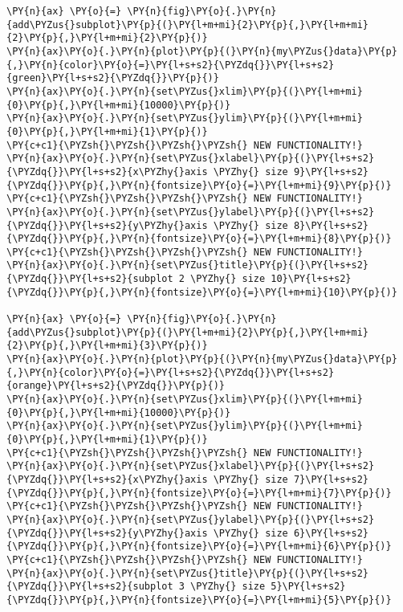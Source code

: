 \begin{tcolorbox}[breakable, size=fbox, boxrule=1pt, pad at break*=1mm,colback=cellbackground, colframe=cellborder]
\begin{Verbatim}[commandchars=\\\{\}]
\PY{n}{ax} \PY{o}{=} \PY{n}{fig}\PY{o}{.}\PY{n}{add\PYZus{}subplot}\PY{p}{(}\PY{l+m+mi}{2}\PY{p}{,}\PY{l+m+mi}{2}\PY{p}{,}\PY{l+m+mi}{2}\PY{p}{)}
\PY{n}{ax}\PY{o}{.}\PY{n}{plot}\PY{p}{(}\PY{n}{my\PYZus{}data}\PY{p}{,}\PY{n}{color}\PY{o}{=}\PY{l+s+s2}{\PYZdq{}}\PY{l+s+s2}{green}\PY{l+s+s2}{\PYZdq{}}\PY{p}{)}
\PY{n}{ax}\PY{o}{.}\PY{n}{set\PYZus{}xlim}\PY{p}{(}\PY{l+m+mi}{0}\PY{p}{,}\PY{l+m+mi}{10000}\PY{p}{)}
\PY{n}{ax}\PY{o}{.}\PY{n}{set\PYZus{}ylim}\PY{p}{(}\PY{l+m+mi}{0}\PY{p}{,}\PY{l+m+mi}{1}\PY{p}{)}
\PY{c+c1}{\PYZsh{}\PYZsh{}\PYZsh{}\PYZsh{} NEW FUNCTIONALITY!}
\PY{n}{ax}\PY{o}{.}\PY{n}{set\PYZus{}xlabel}\PY{p}{(}\PY{l+s+s2}{\PYZdq{}}\PY{l+s+s2}{x\PYZhy{}axis \PYZhy{} size 9}\PY{l+s+s2}{\PYZdq{}}\PY{p}{,}\PY{n}{fontsize}\PY{o}{=}\PY{l+m+mi}{9}\PY{p}{)}
\PY{c+c1}{\PYZsh{}\PYZsh{}\PYZsh{}\PYZsh{} NEW FUNCTIONALITY!}
\PY{n}{ax}\PY{o}{.}\PY{n}{set\PYZus{}ylabel}\PY{p}{(}\PY{l+s+s2}{\PYZdq{}}\PY{l+s+s2}{y\PYZhy{}axis \PYZhy{} size 8}\PY{l+s+s2}{\PYZdq{}}\PY{p}{,}\PY{n}{fontsize}\PY{o}{=}\PY{l+m+mi}{8}\PY{p}{)}
\PY{c+c1}{\PYZsh{}\PYZsh{}\PYZsh{}\PYZsh{} NEW FUNCTIONALITY!}
\PY{n}{ax}\PY{o}{.}\PY{n}{set\PYZus{}title}\PY{p}{(}\PY{l+s+s2}{\PYZdq{}}\PY{l+s+s2}{subplot 2 \PYZhy{} size 10}\PY{l+s+s2}{\PYZdq{}}\PY{p}{,}\PY{n}{fontsize}\PY{o}{=}\PY{l+m+mi}{10}\PY{p}{)}

\PY{n}{ax} \PY{o}{=} \PY{n}{fig}\PY{o}{.}\PY{n}{add\PYZus{}subplot}\PY{p}{(}\PY{l+m+mi}{2}\PY{p}{,}\PY{l+m+mi}{2}\PY{p}{,}\PY{l+m+mi}{3}\PY{p}{)}
\PY{n}{ax}\PY{o}{.}\PY{n}{plot}\PY{p}{(}\PY{n}{my\PYZus{}data}\PY{p}{,}\PY{n}{color}\PY{o}{=}\PY{l+s+s2}{\PYZdq{}}\PY{l+s+s2}{orange}\PY{l+s+s2}{\PYZdq{}}\PY{p}{)}
\PY{n}{ax}\PY{o}{.}\PY{n}{set\PYZus{}xlim}\PY{p}{(}\PY{l+m+mi}{0}\PY{p}{,}\PY{l+m+mi}{10000}\PY{p}{)}
\PY{n}{ax}\PY{o}{.}\PY{n}{set\PYZus{}ylim}\PY{p}{(}\PY{l+m+mi}{0}\PY{p}{,}\PY{l+m+mi}{1}\PY{p}{)}
\PY{c+c1}{\PYZsh{}\PYZsh{}\PYZsh{}\PYZsh{} NEW FUNCTIONALITY!}
\PY{n}{ax}\PY{o}{.}\PY{n}{set\PYZus{}xlabel}\PY{p}{(}\PY{l+s+s2}{\PYZdq{}}\PY{l+s+s2}{x\PYZhy{}axis \PYZhy{} size 7}\PY{l+s+s2}{\PYZdq{}}\PY{p}{,}\PY{n}{fontsize}\PY{o}{=}\PY{l+m+mi}{7}\PY{p}{)}
\PY{c+c1}{\PYZsh{}\PYZsh{}\PYZsh{}\PYZsh{} NEW FUNCTIONALITY!}
\PY{n}{ax}\PY{o}{.}\PY{n}{set\PYZus{}ylabel}\PY{p}{(}\PY{l+s+s2}{\PYZdq{}}\PY{l+s+s2}{y\PYZhy{}axis \PYZhy{} size 6}\PY{l+s+s2}{\PYZdq{}}\PY{p}{,}\PY{n}{fontsize}\PY{o}{=}\PY{l+m+mi}{6}\PY{p}{)}
\PY{c+c1}{\PYZsh{}\PYZsh{}\PYZsh{}\PYZsh{} NEW FUNCTIONALITY!}
\PY{n}{ax}\PY{o}{.}\PY{n}{set\PYZus{}title}\PY{p}{(}\PY{l+s+s2}{\PYZdq{}}\PY{l+s+s2}{subplot 3 \PYZhy{} size 5}\PY{l+s+s2}{\PYZdq{}}\PY{p}{,}\PY{n}{fontsize}\PY{o}{=}\PY{l+m+mi}{5}\PY{p}{)}


\end{Verbatim}
\end{tcolorbox}
